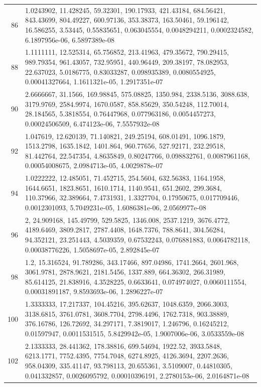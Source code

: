 \documentclass[11pt]{article}
\theoremstyle{definition}
\theoremstyle{remark}
\begin{document}
{\begin{longtable}{r p{}}
86 & 1.0243902, 11.428245, 59.32301, 190.17933, 421.43184, 684.56421, 843.43699, 804.49227, 600.97136, 353.38373, 163.50461, 59.196142, 16.586255, 3.53445, 0.55835651, 0.063045554, 0.0048294211, 0.0002324582, 6.1897956e-06, 6.5897389e-08 \\
88 & 1.1111111, 12.525314, 65.756852, 213.41963, 479.35672, 790.29415, 989.79354, 961.43057, 732.95951, 440.96449, 209.38197, 78.082953, 22.637023, 5.0186775, 0.83033287, 0.098935389, 0.0080554925, 0.00041327664, 1.1611321e-05, 1.2917351e-07 \\
90 & 2.6666667, 31.1566, 169.98845, 575.08825, 1350.984, 2338.5136, 3088.638, 3179.9769, 2584.9974, 1670.0587, 858.85629, 350.54248, 112.70014, 28.184565, 5.3818554, 0.76447968, 0.077963186, 0.0054457273, 0.00024506509, 6.474123e-06, 7.5557932e-08 \\
92 & 1.047619, 12.620139, 71.140821, 249.25194, 608.01491, 1096.1879, 1513.2798, 1635.1842, 1401.864, 960.77656, 527.92171, 232.29518, 81.442764, 22.547354, 4.8635849, 0.80247766, 0.098832761, 0.0087961168, 0.00054008675, 2.0984713e-05, 4.0029878e-07 \\
94 & 1.0222222, 12.485051, 71.452715, 254.5604, 632.56383, 1164.1958, 1644.6651, 1823.8651, 1610.1714, 1140.9541, 651.2602, 299.3684, 110.37966, 32.389664, 7.4731931, 1.3327704, 0.17950675, 0.017709446, 0.0012301093, 5.7049231e-05, 1.6086381e-06, 2.0569977e-08 \\
96 & 2, 24.909168, 145.49799, 529.5825, 1346.008, 2537.1219, 3676.4772, 4189.6469, 3809.2817, 2787.4408, 1648.7376, 788.8641, 304.56284, 94.352121, 23.251443, 4.5039359, 0.67532243, 0.076881883, 0.0064782118, 0.00038776226, 1.5058697e-05, 2.892845e-07 \\
98 & 1.2, 15.316524, 91.789286, 343.17466, 897.04986, 1741.2664, 2601.968, 3061.9781, 2878.9621, 2181.5456, 1337.889, 664.36302, 266.31989, 85.614125, 21.838916, 4.3528225, 0.6633641, 0.074974027, 0.0060111554, 0.00031891187, 9.8593693e-06, 1.2896227e-07 \\
100 & 1.3333333, 17.217337, 104.45216, 395.62637, 1048.6359, 2066.3003, 3138.6815, 3761.0781, 3608.7704, 2798.4496, 1762.7318, 903.38889, 376.16786, 126.72692, 34.297171, 7.3819017, 1.246796, 0.16245212, 0.01597947, 0.0011531515, 5.8429942e-05, 1.9007006e-06, 3.0533559e-08 \\
102 & 2.1333333, 28.441362, 178.38816, 699.54694, 1922.52, 3933.5848, 6213.1771, 7752.4395, 7754.7048, 6274.8925, 4126.3694, 2207.2636, 958.04309, 335.41147, 93.798113, 20.655361, 3.5109007, 0.44810305, 0.041332857, 0.0026095792, 0.00010396191, 2.2780153e-06, 2.0164871e-08 \\

\end{longtable}}
\end{document}
